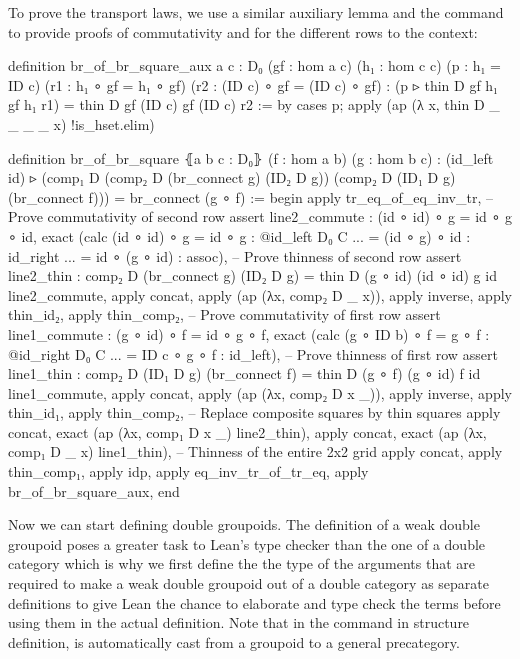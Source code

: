 To prove the transport laws, we use a similar auxiliary lemma and the
 command to provide proofs of commutativity and  for the different
rows to the context:
\begin{leancodebr}
  definition br_of_br_square_aux {a c : D₀} (gf : hom a c)
    (h₁ : hom c c) (p : h₁ = ID c)
    (r1 : h₁ ∘ gf = h₁ ∘ gf) (r2 : (ID c) ∘ gf = (ID c) ∘ gf) :
    (p ▹ thin D gf h₁ gf h₁ r1) = thin D gf (ID c) gf (ID c) r2 :=
  by cases p; apply (ap (λ x, thin D _ _ _ _ x) !is_hset.elim)

  definition br_of_br_square ⦃a b c : D₀⦄ (f : hom a b) (g : hom b c) :
    (id_left id) ▹ (comp₁ D (comp₂ D (br_connect g) (ID₂ D g))
      (comp₂ D (ID₁ D g) (br_connect f)))
    = br_connect (g ∘ f) :=
  begin
    apply tr_eq_of_eq_inv_tr,
    -- Prove commutativity of second row
    assert line2_commute : (id ∘ id) ∘ g = id ∘ g ∘ id,
      exact (calc (id ∘ id) ∘ g = id ∘ g : @id_left D₀ C
                           ... = (id ∘ g) ∘ id : id_right
                           ... = id ∘ (g ∘ id) : assoc),
    -- Prove thinness of second row
    assert line2_thin : comp₂ D (br_connect g) (ID₂ D g)
      = thin D (g ∘ id) (id ∘ id) g id line2_commute,
      apply concat, apply (ap (λx, comp₂ D _ x)), apply inverse, apply thin_id₂,
      apply thin_comp₂,
    -- Prove commutativity of first row
    assert line1_commute : (g ∘ id) ∘ f = id ∘ g ∘ f,
      exact (calc (g ∘ ID b) ∘ f = g ∘ f : @id_right D₀ C
                            ... = ID c ∘ g ∘ f : id_left),
    -- Prove thinness of first row
    assert line1_thin : comp₂ D (ID₁ D g) (br_connect f)
      = thin D (g ∘ f) (g ∘ id) f id line1_commute,
      apply concat, apply (ap (λx, comp₂ D x _)), apply inverse, apply thin_id₁,
      apply thin_comp₂,
    -- Replace composite squares by thin squares
    apply concat, exact (ap (λx, comp₁ D x _) line2_thin),
    apply concat, exact (ap (λx, comp₁ D _ x) line1_thin),
    -- Thinness of the entire 2x2 grid
    apply concat, apply thin_comp₁, apply idp,
    apply eq_inv_tr_of_tr_eq,
    apply br_of_br_square_aux,
  end
\end{leancodebr}

Now we can start defining double groupoids.
The definition of a weak double groupoid poses a greater task to Lean's type
checker than the one of a double category which is why we first define the the
type of the arguments that are required to make a weak double groupoid out of a
double category as separate definitions to give Lean the chance to elaborate
and type check the terms before using them in the actual definition.
Note that in the  command in structure definition,  is
automatically cast from a groupoid to a general precategory.

